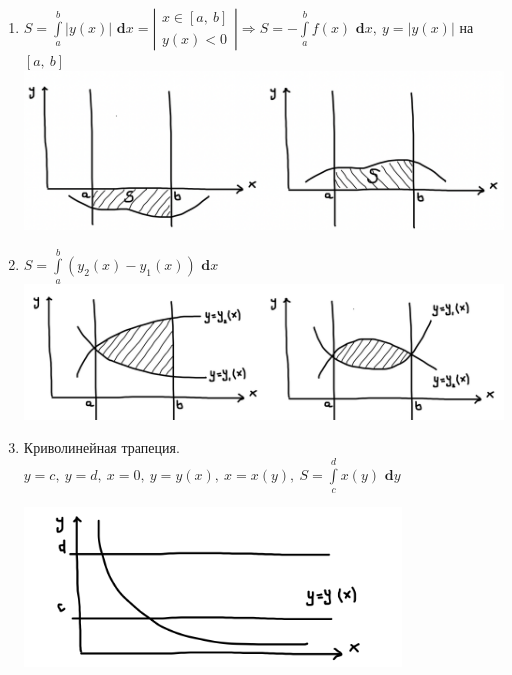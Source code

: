\documentclass[a4paper,12pt, centered]{bookest}
\theoremstyle{remark}
\newcommand\dx{\textbf{ d}x}
\newcommand\dy{\textbf{ d}}
\begin{document}
\begin{enumerate}
\begin{enumerate}
    
			\item $S=\int\limits_a^b|y(x)|\dx=\left|\begin{array}{c}
				x\in[a,\>b]\\y(x)<0
			\end{array} \right|\Rightarrow S=-\int\limits_a^bf(x)\dx,\>y=|y(x)|$ на $[a,\>b]$
			\includegraphics[width=14cm]{2_9_2_3}\newpage
			\item $S=\int\limits_a^b(y_2(x)-y_1(x))\dx$ \\\includegraphics[width=14cm]{2_9_2_4}
			\item Криволинейная трапеция. \\$y=c,\>y=d,\>x=0,\>y=y(x),\>x=x(y),\>S=\int\limits_c^dx(y)\dy y$\\\begin{center}
				\includegraphics[width=10cm]{2_9_2_5}


\end{center}
\end{enumerate}
\end{enumerate}
\end{document}

